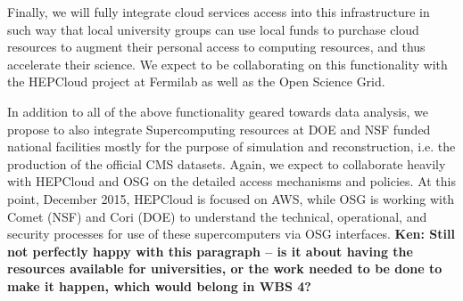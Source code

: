 \documentclass[11pt,a4paper]{article}
\begin{document}
%

Finally, we will fully integrate cloud services access into this
infrastructure in such way that local university groups can use local
funds to purchase cloud resources to augment their personal access to
computing resources, and thus accelerate their science. We expect to
be collaborating on this functionality with the HEPCloud project at
Fermilab as well as the Open Science Grid.

In addition to all of the above functionality geared towards data
analysis, we propose to also integrate Supercomputing resources at DOE
and NSF funded national facilities mostly for the purpose of
simulation and reconstruction, i.e. the production of the official CMS
datasets.  Again, we expect to collaborate heavily with HEPCloud and
OSG on the detailed access mechanisms and policies.  At this point,
December 2015, HEPCloud is focused on AWS, while OSG is working with
Comet (NSF) and Cori (DOE) to understand the technical, operational,
and security processes for use of these supercomputers via OSG
interfaces.  {\bf Ken: Still not perfectly happy with this paragraph -- is
  it about having the resources available for universities, or the work
  needed to be done to make it happen, which would belong in WBS 4?}
\end{document}
